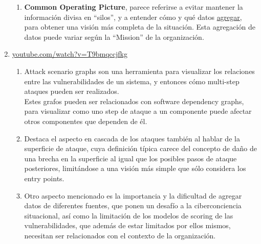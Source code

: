 \begin{enumerate}
\begin{enumerate}
      \item \textbf{Common Operating Picture}, parece referirse a evitar mantener la información divisa en ``silos'', y a entender cómo y qué datos \ul{agregar}, para obtener una visión más completa de la situación. Esta agregación de datos puede variar según la ``Mission'' de la organización. 
   \end{enumerate}
   \item \href{https://www.youtube.com/watch?v=T9bmqccjfkg}{youtube.com/watch?v=T9bmqccjfkg}
   \begin{enumerate}
      \item Attack scenario graphs son una herramienta para visualizar los relaciones entre las vulnerabilidades de un sistema, y entonces cómo multi-step ataques pueden ser realizados.\\
      Estes grafos pueden ser relacionados con software dependency graphs, para visualizar como uno step de ataque a un componente puede afectar otros componentes que dependen de él.
      \item Destaca el aspecto en cascada de los ataques también al hablar de la superficie de ataque, cuya definición típica carece del concepto de daño de una brecha en la superficie al igual que los posibles pasos de ataque posteriores, limitándose a una visión más simple que sólo considera los entry points.
      \item Otro aspecto mencionado es la importancia y la dificultad de agregar datos de diferentes fuentes, que ponen un desafío a la ciberconciencia situacional, así como la limitación de los modelos de scoring de las vulnerabilidades, que además de estar limitados por ellos mismos, necesitan ser relacionados con el contexto de la organización.
   \end{enumerate}
\end{enumerate}
